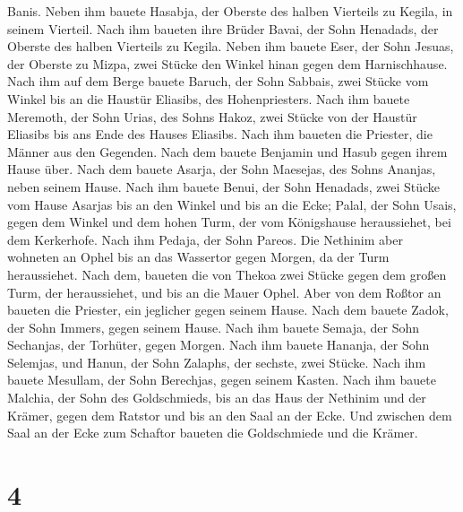 Banis. Neben ihm bauete Hasabja, der Oberste des halben Vierteils zu
Kegila, in seinem Vierteil.  Nach ihm baueten ihre Brüder
Bavai, der Sohn Henadads, der Oberste des halben Vierteils zu Kegila.
 Neben ihm bauete Eser, der Sohn Jesuas, der Oberste zu
Mizpa, zwei Stücke den Winkel hinan gegen dem Harnischhause.
 Nach ihm auf dem Berge bauete Baruch, der Sohn Sabbais,
zwei Stücke vom Winkel bis an die Haustür Eliasibs, des Hohenpriesters.
 Nach ihm bauete Meremoth, der Sohn Urias, des Sohns Hakoz,
zwei Stücke von der Haustür Eliasibs bis ans Ende des Hauses Eliasibs.
 Nach ihm baueten die Priester, die Männer aus den
Gegenden.  Nach dem bauete Benjamin und Hasub gegen ihrem
Hause über. Nach dem bauete Asarja, der Sohn Maesejas, des Sohns
Ananjas, neben seinem Hause.  Nach ihm bauete Benui, der
Sohn Henadads, zwei Stücke vom Hause Asarjas bis an den Winkel und bis
an die Ecke;  Palal, der Sohn Usais, gegen dem Winkel und
dem hohen Turm, der vom Königshause heraussiehet, bei dem Kerkerhofe.
Nach ihm Pedaja, der Sohn Pareos.  Die Nethinim aber
wohneten an Ophel bis an das Wassertor gegen Morgen, da der Turm
heraussiehet.  Nach dem, baueten die von Thekoa zwei Stücke
gegen dem großen Turm, der heraussiehet, und bis an die Mauer Ophel.
 Aber von dem Roßtor an baueten die Priester, ein jeglicher
gegen seinem Hause.  Nach dem bauete Zadok, der Sohn
Immers, gegen seinem Hause. Nach ihm bauete Semaja, der Sohn Sechanjas,
der Torhüter, gegen Morgen.  Nach ihm bauete Hananja, der
Sohn Selemjas, und Hanun, der Sohn Zalaphs, der sechste, zwei Stücke.
Nach ihm bauete Mesullam, der Sohn Berechjas, gegen seinem Kasten.
 Nach ihm bauete Malchia, der Sohn des Goldschmieds, bis an
das Haus der Nethinim und der Krämer, gegen dem Ratstor und bis an den
Saal an der Ecke.  Und zwischen dem Saal an der Ecke zum
Schaftor baueten die Goldschmiede und die Krämer.

\hypertarget{section-3}{%
\section{4}\label{section-3}}

